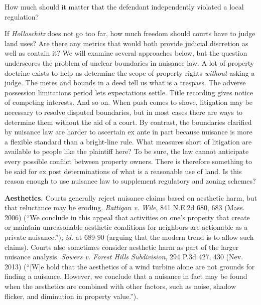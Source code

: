 
\item How much should it matter that the defendant independently violated a
local regulation?

\item If \textit{Holloschitz} does not go too far, how much freedom should
courts have to judge land uses? Are there any metrics that would both provide
judicial discretion as well as contain it? We will examine several approaches
below, but the question underscores the problem of unclear boundaries in
nuisance law. A lot of property doctrine exists to help us determine the scope
of property rights \textit{without} asking a judge. The metes and bounds in a
deed tell us what is a trespass. The adverse possession limitations period lets
expectations settle. Title recording gives notice of competing interests. And so
on. When push comes to shove, litigation may be necessary to resolve disputed
boundaries, but in most cases there are ways to determine them without the aid
of a court. By contrast, the boundaries clarified by nuisance law are harder to
ascertain ex ante in part because nuisance is more a flexible standard than a
bright-line rule. What measures short of litigation are available to people like
the plaintiff here? To be sure, the law cannot anticipate every possible
conflict between property owners. There is therefore something to be said for ex
post determinations of what is a reasonable use of land. Is this reason enough
to use nuisance law to supplement regulatory and zoning schemes?

\item \textbf{Aesthetics.} Courts generally reject nuisance claims based on
aesthetic harm, but that reluctance may be eroding. \emph{Rattigan v. Wile}, 841
N.E.2d 680, 683 (Mass. 2006) (``We conclude in this appeal that activities on
one's property that create or maintain unreasonable aesthetic conditions for
neighbors are actionable as a private nuisance.''); \textit{id.} at 689-90
(arguing that the modern trend is to allow such claims). Courts also sometimes
consider aesthetic harm as part of the larger nuisance analysis. \emph{Sowers v.
Forest Hills Subdivision}, 294 P.3d 427, 430 (Nev. 2013) (``[W]e hold that the
aesthetics of a wind turbine alone are not grounds for finding a nuisance.
However, we conclude that a nuisance in fact may be found when the aesthetics
are combined with other factors, such as noise, shadow flicker, and diminution
in property value.''). 

